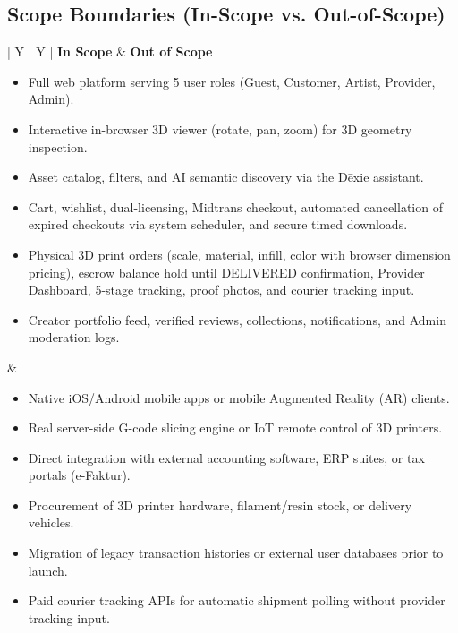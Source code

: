 \documentclass[11pt,a4paper]{article}
\newcommand{\thdr}[1]{\centering\arraybackslash\textbf{#1}}
\begin{document}
\clearpage

\subsection{Scope Boundaries (In-Scope vs. Out-of-Scope)}

\begin{table}[H]
\centering
\caption{Project Scope Boundaries Matrix}
\begin{tabularx}{\textwidth}{| Y | Y |}
\hline
{} \thdr{In Scope} & \thdr{Out of Scope} \\
\hline
\begin{itemize}[leftmargin=1.1em, itemsep=2pt, topsep=2pt]
    \item Full web platform serving 5 user roles (Guest, Customer, Artist, Provider, Admin).
    \item Interactive in-browser 3D viewer (rotate, pan, zoom) for 3D geometry inspection.
    \item Asset catalog, filters, and AI semantic discovery via the D\={e}xie assistant.
    \item Cart, wishlist, dual-licensing, Midtrans checkout, automated cancellation of expired checkouts via system scheduler, and secure timed downloads.
    \item Physical 3D print orders (scale, material, infill, color with browser dimension pricing), escrow balance hold until DELIVERED confirmation, Provider Dashboard, 5-stage tracking, proof photos, and courier tracking input.
    \item Creator portfolio feed, verified reviews, collections, notifications, and Admin moderation logs.
\end{itemize}
&
\begin{itemize}[leftmargin=1.1em, itemsep=2pt, topsep=2pt]
    \item Native iOS/Android mobile apps or mobile Augmented Reality (AR) clients.
    \item Real server-side G-code slicing engine or IoT remote control of 3D printers.
    \item Direct integration with external accounting software, ERP suites, or tax portals (e-Faktur).
    \item Procurement of 3D printer hardware, filament/resin stock, or delivery vehicles.
    \item Migration of legacy transaction histories or external user databases prior to launch.
    \item Paid courier tracking APIs for automatic shipment polling without provider tracking input.
\end{itemize} \\
\hline
\end{tabularx}
\end{table}
\end{document}
